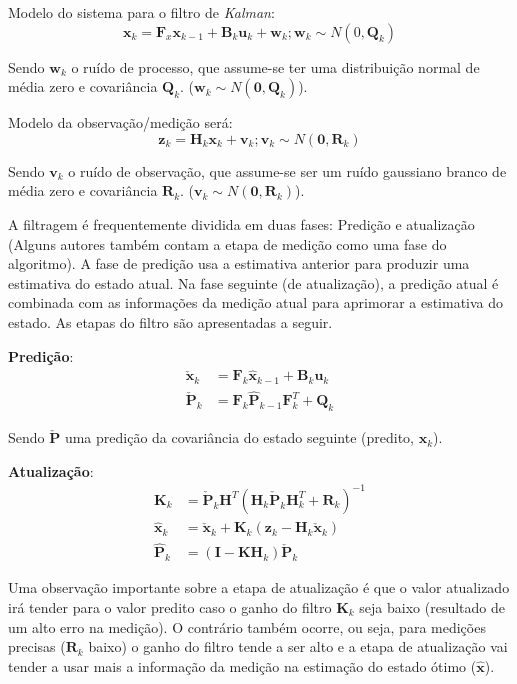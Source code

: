Modelo do sistema para o filtro de \emph{Kalman}:
\begin{equation}
\textbf{x}_k = \textbf{F}_x \textbf{x}_{k-1} + \textbf{B}_k \textbf{u}_k + \textbf{w}_k; \textbf{w}_k \sim N(0, \textbf{Q}_k)
\end{equation}

Sendo $\textbf{w}_k$ o ruído de processo, que assume-se ter uma distribuição normal de média zero e covariância $\textbf{Q}_k$. ($\textbf{w}_k \sim N(\textbf{0}, \textbf{Q}_k)$).

Modelo da observação/medição será:
\begin{equation}
\textbf{z}_k = \textbf{H}_k \textbf{x}_k + \textbf{v}_k; \textbf{v}_k \sim N(\textbf{0}, \textbf{R}_k)
\end{equation}

Sendo $\textbf{v}_k$ o ruído de observação, que assume-se ser um ruído gaussiano branco de média zero e covariância $\textbf{R}_k$. ($\textbf{v}_k \sim N(\textbf{0}, \textbf{R}_k)$).

A filtragem é frequentemente dividida em duas fases: Predição e atualização (Alguns autores também contam a etapa de medição como uma fase do algoritmo). A fase de predição usa a estimativa anterior para produzir uma estimativa do estado atual. Na fase seguinte (de atualização), a predição atual é combinada com as informações da medição atual para aprimorar a estimativa do estado. As etapas do filtro são apresentadas a seguir.

\textbf{Predição}:
\begin{align*}
    \check{\textbf{x}}_k &= \textbf{F}_k \hat{\textbf{x}}_{k-1} + \textbf{B}_k \textbf{u}_k\\
    \check{\textbf{P}}_k &= \textbf{F}_k \hat{\textbf{P}}_{k-1} \textbf{F}^T_k + \textbf{Q}_k
\end{align*}

Sendo $\check{\textbf{P}}$ uma predição da covariância do estado seguinte (predito, $\textbf{x}_k$).

\textbf{Atualização}:
\begin{align*}
    \textbf{K}_k &= \check{\textbf{P}}_k \textbf{H}^T \left( \textbf{H}_k \check{\textbf{P}}_k \textbf{H}^T_k + \textbf{R}_k\right)^{-1}\\
    \hat{\textbf{x}}_k &= \check{\textbf{x}}_k + \textbf{K}_k\left( \textbf{z}_k - \textbf{H}_k \check{\textbf{x}}_k \right)\\
    \hat{\textbf{P}}_k &= \left(\textbf{I} - \textbf{KH}_k \right)\check{\textbf{P}}_k
\end{align*}

Uma observação importante sobre a etapa de atualização é que o valor atualizado irá tender para o valor predito caso o ganho do filtro $\textbf{K}_k$ seja baixo (resultado de um alto erro na medição). O contrário também ocorre, ou seja, para medições precisas ($\textbf{R}_k$ baixo) o ganho do filtro tende a ser alto e a etapa de atualização vai tender a usar mais a informação da medição na estimação do estado ótimo ($\hat{\textbf{x}}$). 
